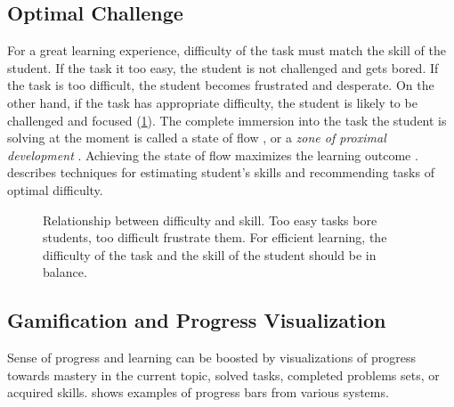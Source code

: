 \subsection{Optimal Challenge}  %
\label{sec:motivation.challenge}
For a great learning experience,
  difficulty of the task must match the skill of the student.
If the task it too easy,
  the student is not challenged and gets bored.
If the task is too difficult,
  the student becomes frustrated and desperate.
On the other hand, if the task has appropriate difficulty,
  the student is likely to be challenged and focused
  (\cref{fig:flow}).
The complete immersion into the task the student is solving at the moment is called
  a state of flow \cite{flow},
  or a \emph{zone of proximal development} \cite{zone-of-proximal-development}.
Achieving the state of flow maximizes the learning outcome \cite{adaptive-practice}.
 describes techniques for estimating student's skills
and recommending tasks of optimal difficulty.

\begin{figure}[htb]
  \centering
  \caption{
    Relationship between difficulty and skill.
    Too easy tasks bore students, too difficult frustrate them.
    For efficient learning, the difficulty of the task
    and the skill of the student should be in balance.
  }
  \label{fig:flow}
\end{figure}



\subsection{Gamification and Progress Visualization}

Sense of progress and learning can be boosted by visualizations of
progress towards mastery in the current topic, solved tasks, completed problems sets,
or acquired skills.
 shows examples of progress bars from various systems.

